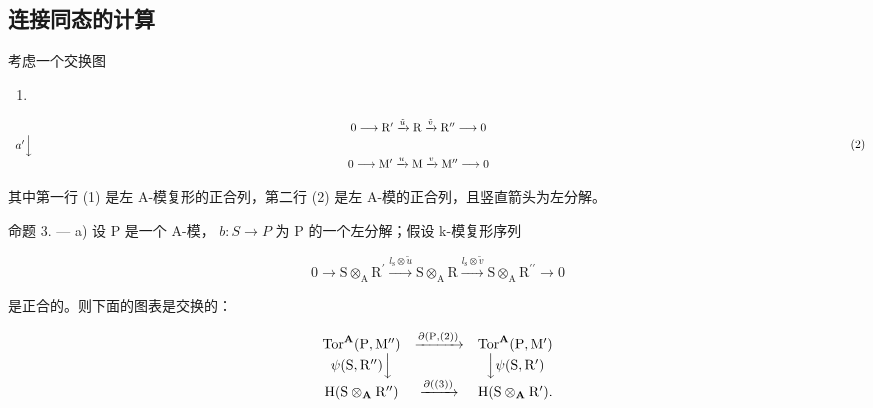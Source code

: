 \subsection{连接同态的计算}

考虑一个交换图

\begin{enumerate}
\def\labelenumi{(\arabic{enumi})}
\tightlist
\item
\end{enumerate}

\[
\begin{array}{c} 0 \longrightarrow \mathrm{R} ^ {\prime} \xrightarrow {\tilde {u}} \mathrm{R} \xrightarrow {\tilde {v}} \mathrm{R} ^ {\prime \prime} \longrightarrow 0 \\ a ^ {\prime} \Big \downarrow \qquad \qquad \qquad \qquad \qquad \qquad \qquad \qquad \qquad \qquad \qquad \qquad \qquad \qquad \qquad \qquad \qquad \qquad \qquad \qquad \qquad \qquad \qquad \qquad \qquad \qquad \qquad \qquad \qquad \qquad \qquad \qquad \qquad \qquad \\ 0 \longrightarrow \mathrm{M} ^ {\prime} \xrightarrow {u} \mathrm{M} \xrightarrow {v} \mathrm{M} ^ {\prime \prime} \longrightarrow 0 \end{array}\tag{2}
\]

其中第一行 (1) 是左 A-模复形的正合列，第二行 (2) 是左 A-模的正合列，且竖直箭头为左分解。

命题 3. --- a) 设 P 是一个 A-模， \(b: S \to P\) 为 P 的一个左分解；假设 k-模复形序列

\[
0 \rightarrow \mathrm{S} \otimes_ {\mathrm{A}} \mathrm{R} ^ {\prime} \xrightarrow {l _ {\mathrm{s}} \otimes \tilde {u}} \mathrm{S} \otimes_ {\mathrm{A}} \mathrm{R} \xrightarrow {l _ {\mathrm{s}} \otimes \tilde {v}} \mathrm{S} \otimes_ {\mathrm{A}} \mathrm{R} ^ {\prime \prime} \rightarrow 0\tag{3}
\]

是正合的。则下面的图表是交换的：

\[
\begin{array}{c c c} \operatorname{Tor} ^ {\mathbf {A}} (\mathrm{P}, \mathrm{M} ^ {\prime \prime}) & \xrightarrow {\partial (\mathrm{P} , (2))} & \operatorname{Tor} ^ {\mathbf {A}} (\mathrm{P}, \mathrm{M} ^ {\prime}) \\ \psi (\mathrm{S}, \mathrm{R} ^ {\prime \prime}) \Big \downarrow & & \Big \downarrow \psi (\mathrm{S}, \mathrm{R} ^ {\prime}) \\ \mathrm{H} (\mathrm{S} \otimes_ {\mathbf {A}} \mathrm{R} ^ {\prime \prime}) & \xrightarrow {\partial ((3))} & \mathrm{H} (\mathrm{S} \otimes_ {\mathbf {A}} \mathrm{R} ^ {\prime}). \end{array}
\]


